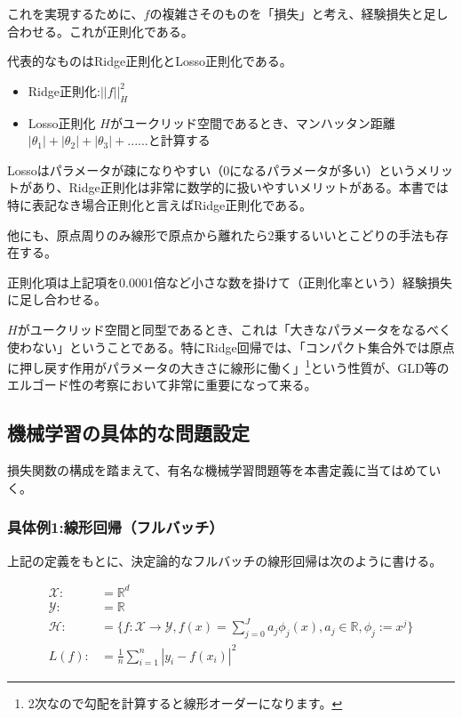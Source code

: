 \documentclass{jsarticle}
\begin{document}
これを実現するために、$f$の複雑さそのものを「損失」と考え、経験損失と足し合わせる。これが正則化である。

代表的なものはRidge正則化とLosso正則化である。

\begin{itemize} 
\item Ridge正則化:$||f||^2_H$
\item Losso正則化 $H$がユークリッド空間であるとき、マンハッタン距離$|\theta_1|+|\theta_2|+|\theta_3|+......$と計算する
\end{itemize}

Lossoはパラメータが疎になりやすい（0になるパラメータが多い）というメリットがあり、Ridge正則化は非常に数学的に扱いやすいメリットがある。本書では特に表記なき場合正則化と言えばRidge正則化である。

他にも、原点周りのみ線形で原点から離れたら2乗するいいとこどりの手法も存在する。

正則化項は上記項を0.0001倍など小さな数を掛けて（正則化率という）経験損失に足し合わせる。

$H$がユークリッド空間と同型であるとき、これは「大きなパラメータをなるべく使わない」ということである。特にRidge回帰では、「コンパクト集合外では原点に押し戻す作用がパラメータの大きさに線形に働く」\footnote{2次なので勾配を計算すると線形オーダーになります。}という性質が、GLD等のエルゴード性の考察において非常に重要になって来る。

\subsection{機械学習の具体的な問題設定}
損失関数の構成を踏まえて、有名な機械学習問題等を本書定義に当てはめていく。




\subsubsection{具体例1:線形回帰（フルバッチ）}

上記の定義をもとに、決定論的なフルバッチの線形回帰は次のように書ける。

\begin{align}
\mathcal{X}:&=\mathbb{R}^d\\
\mathcal{Y}:&=\mathbb{R}\\
\mathcal{H}:&=\{f:\mathcal{X}\to\mathcal{Y},f(x)=\sum^J_{j=0}a_j\phi_j(x),a_j\in\mathbb{R},\phi_j:=x^j\}\\
L(f):&=\frac{1}{n}\sum^n_{i=1}|y_i-f(x_i)|^2
\end{align}
\end{document}
